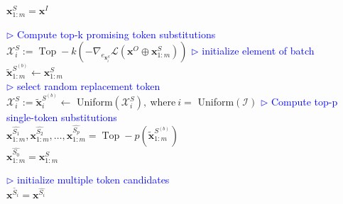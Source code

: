 \begin{algorithm}[H]
	{
		\caption{$\mathcal{I}$-GCG}\label{alg:ours}

        $\boldsymbol{x}_{1:m}^{S}=\boldsymbol{x}^I$ \\
        {
            {
                \textcolor{blue}{$\rhd$ Compute top-k promising token substitutions}\\
                $\mathcal{X}_i^{S}:=\operatorname{Top}-k\left(-\nabla_{e_{\boldsymbol{x}_{i}^{S}}} \mathcal{L}\left(\boldsymbol{x}^{O} \oplus \boldsymbol{x}_{1:m}^{S}\right)\right)$
            }
                {
                \textcolor{blue}{$\rhd$ initialize element of batch}\\
                $\tilde{\boldsymbol{x}}_{1:m}^{{S}^{(b)}} \gets \boldsymbol{x}_{1:m}^{S} $\\
                \textcolor{blue}{$\rhd$ select random replacement token}\\
                $\mathcal{X}_i^{S}:= \tilde{\boldsymbol{x}}_{i}^{{S}^{(b)}} \gets$ Uniform$(\mathcal{X}_i^{S}),~$where$~i =$ Uniform$(\mathcal{I})$
                }
            \textcolor{blue}{$\rhd$ Compute top-p single-token substitutions}\\
            $\boldsymbol{x}_{1:m}^{\hat{S_1}}, \boldsymbol{x}_{1:m}^{\hat{S_2}}, \ldots, \boldsymbol{x}_{1:m}^{\hat{S_p}}=\operatorname{Top}-p(\tilde{\boldsymbol{x}}_{1:m}^{{S}^{(b)}})$ \\
            $\boldsymbol{x}_{1:m}^{\hat{S_0}} = \boldsymbol{x}_{1:m}^{S}  $\\
                { 
                \textcolor{blue}{$\rhd$ initialize multiple token candidates }\\
                $\boldsymbol{x}^{\tilde{S_i}} = \boldsymbol{x}^{\hat{S_i}} $
                
}}}
\end{algorithm}

